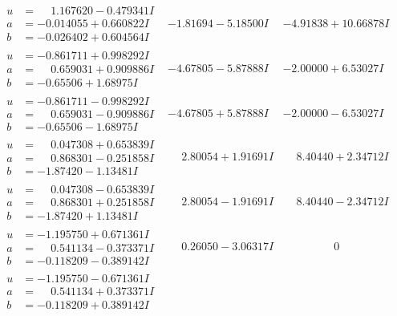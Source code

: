 \documentclass[1p]{elsarticle_modified}
\theoremstyle{definition}
\begin{document}
$$\begin{array}{c|c|c}
\begin{aligned}
u &= \phantom{-}1.167620 - 0.479341 I \\
a &= -0.014055 + 0.660822 I \\
b &= -0.026402 + 0.604564 I\end{aligned}
 & -1.81694 - 5.18500 I & -4.91838 + 10.66878 I \\ \hline\begin{aligned}
u &= -0.861711 + 0.998292 I \\
a &= \phantom{-}0.659031 + 0.909886 I \\
b &= -0.65506 + 1.68975 I\end{aligned}
 & -4.67805 - 5.87888 I & -2.00000 + 6.53027 I \\ \hline\begin{aligned}
u &= -0.861711 - 0.998292 I \\
a &= \phantom{-}0.659031 - 0.909886 I \\
b &= -0.65506 - 1.68975 I\end{aligned}
 & -4.67805 + 5.87888 I & -2.00000 - 6.53027 I \\ \hline\begin{aligned}
u &= \phantom{-}0.047308 + 0.653839 I \\
a &= \phantom{-}0.868301 - 0.251858 I \\
b &= -1.87420 - 1.13481 I\end{aligned}
 & \phantom{-}2.80054 + 1.91691 I & \phantom{-}8.40440 + 2.34712 I \\ \hline\begin{aligned}
u &= \phantom{-}0.047308 - 0.653839 I \\
a &= \phantom{-}0.868301 + 0.251858 I \\
b &= -1.87420 + 1.13481 I\end{aligned}
 & \phantom{-}2.80054 - 1.91691 I & \phantom{-}8.40440 - 2.34712 I \\ \hline\begin{aligned}
u &= -1.195750 + 0.671361 I \\
a &= \phantom{-}0.541134 - 0.373371 I \\
b &= -0.118209 - 0.389142 I\end{aligned}
 & \phantom{-}0.26050 - 3.06317 I & \phantom{-0.000000 } 0 \\ \hline\begin{aligned}
u &= -1.195750 - 0.671361 I \\
a &= \phantom{-}0.541134 + 0.373371 I \\
b &= -0.118209 + 0.389142 I\end{aligned}

\end{array}$$
\end{document}
